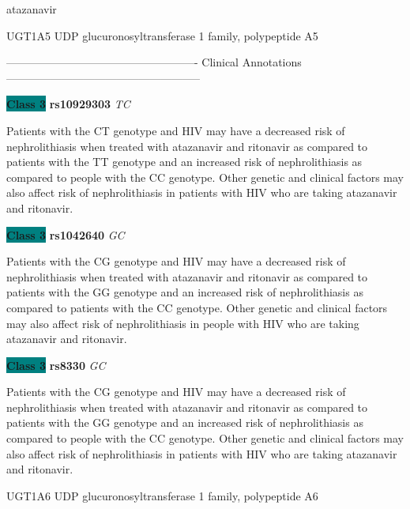 \documentclass{resume} %
\begin{document}
\begin{rSection}{ atazanavir }
\begin{rSubsection}{ UGT1A5 }{ UDP glucuronosyltransferase 1 family, polypeptide A5 }{}{}
\item[] ---------------------------------------------------- Clinical Annotations -----------------------------------------------------\newline
\item \textbf{\colorbox{teal} {Class 3}} \textbf{ rs10929303 } \textit{ TC }
\item[] Patients with the CT genotype and HIV may have a decreased risk of nephrolithiasis when treated with atazanavir and ritonavir as compared to patients with the TT genotype and an increased risk of nephrolithiasis as compared to people with the CC genotype. Other genetic and clinical factors may also affect risk of nephrolithiasis in patients with HIV who are taking atazanavir and ritonavir. \item \textbf{\colorbox{teal} {Class 3}} \textbf{ rs1042640 } \textit{ GC }
\item[] Patients with the CG genotype and HIV may have a decreased risk of nephrolithiasis when treated with atazanavir and ritonavir as compared to patients with the GG genotype and an increased risk of nephrolithiasis as compared to patients with the CC genotype. Other genetic and clinical factors may also affect risk of nephrolithiasis in people with HIV who are taking atazanavir and ritonavir.\item \textbf{\colorbox{teal} {Class 3}} \textbf{ rs8330 } \textit{ GC }
\item[] Patients with the CG genotype and HIV may have a decreased risk of nephrolithiasis when treated with atazanavir and ritonavir as compared to patients with the GG genotype and an increased risk of nephrolithiasis as compared to people with the CC genotype. Other genetic and clinical factors may also affect risk of nephrolithiasis in patients with HIV who are taking atazanavir and ritonavir.
\end{rSubsection}\begin{rSubsection}{ UGT1A6 }{ UDP glucuronosyltransferase 1 family, polypeptide A6 }{}{}
\item[]


\end{rSubsection}
\end{rSection}
\end{document}
